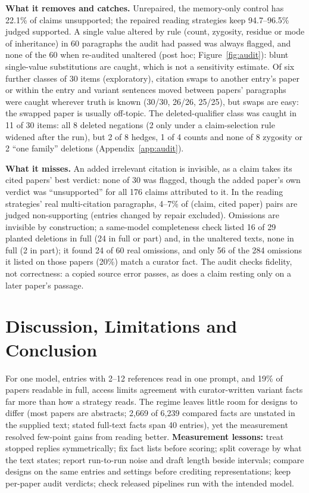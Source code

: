 \documentclass{article} %
\begin{document}
\textbf{What it removes and catches.} Unrepaired, the memory-only control has 22.1\% of claims unsupported; the repaired reading strategies keep 94.7--96.5\% judged supported. A single value altered by rule (count, zygosity, residue or mode of inheritance) in 60 paragraphs the audit had passed was always flagged, and none of the 60 when re-audited unaltered (post hoc; Figure~\ref{fig:audit}): blunt single-value substitutions are caught, which is not a sensitivity estimate. Of six further classes of 30 items (exploratory), citation swaps to another entry's paper or within the entry and variant sentences moved between papers' paragraphs were caught wherever truth is known (30/30, 26/26, 25/25), but swaps are easy: the swapped paper is usually off-topic. The deleted-qualifier class was caught in 11 of 30 items: all 8 deleted negations (2 only under a claim-selection rule widened after the run), but 2 of 8 hedges, 1 of 4 counts and none of 8 zygosity or 2 ``one family'' deletions (Appendix~\ref{app:audit}).

\textbf{What it misses.} An added irrelevant citation is invisible, as a claim takes its cited papers' best verdict: none of 30 was flagged, though the added paper's own verdict was ``unsupported'' for all 176 claims attributed to it. In the reading strategies' real multi-citation paragraphs, 4--7\% of (claim, cited paper) pairs are judged non-supporting (entries changed by repair excluded). Omissions are invisible by construction; a same-model completeness check listed 16 of 29 planted deletions in full (24 in full or part) and, in the unaltered texts, none in full (2 in part); it found 24 of 60 real omissions, and only 56 of the 284 omissions it listed on those papers (20\%) match a curator fact. The audit checks fidelity, not correctness: a copied source error passes, as does a claim resting only on a later paper's passage.

\section{Discussion, Limitations and Conclusion}
\label{sec:discussion}
For one model, entries with 2--12 references read in one prompt, and 19\% of papers readable in full, access limits agreement with curator-written variant facts far more than how a strategy reads. The regime leaves little room for designs to differ (most papers are abstracts; 2,669 of 6,239 compared facts are unstated in the supplied text; stated full-text facts span 40 entries), yet the measurement resolved few-point gains from reading better. \textbf{Measurement lessons:} treat stopped replies symmetrically; fix fact lists before scoring; split coverage by what the text states; report run-to-run noise and draft length beside intervals; compare designs on the same entries and settings before crediting representations; keep per-paper audit verdicts; check released pipelines run with the intended model.
\end{document}
